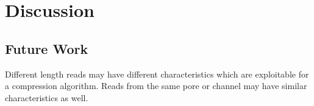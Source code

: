 \chapter{Discussion} \label{chap:disc}

\section{Future Work}

Different length reads may have different characteristics which are exploitable for a compression algorithm.
Reads from the same pore or channel may have similar characteristics as well.

